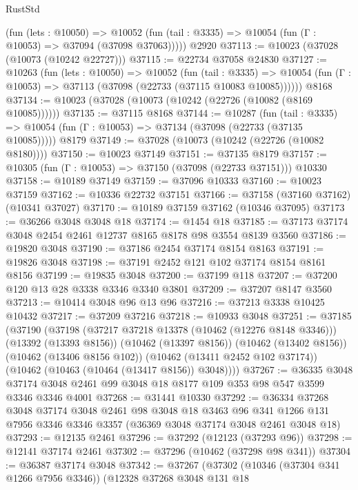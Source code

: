 \begin{lexlean}{RustStd}
\begin{coremodule}
      (fun (lets : @10050) =>
      @10052 (fun (tail : @3335) => @10054 (fun (Γ : @10053) => @37094 (@37098 @37063)))))
    @2920
@37113 := @10023 (@37028 (@10073 (@10242 @22727)))
@37115 := @22734 @37058 @24830
@37127 := @10263
    (fun (lets : @10050) =>
    @10052
      (fun (tail : @3335) =>
      @10054 (fun (Γ : @10053) => @37113 (@37098 (@22733 (@37115 @10083 @10085))))))
    @8168
@37134 := @10023 (@37028 (@10073 (@10242 (@22726 (@10082 (@8169 @10085))))))
@37135 := @37115 @8168
@37144 := @10287
    (fun (tail : @3335) => @10054 (fun (Γ : @10053) => @37134 (@37098 (@22733 (@37135 @10085)))))
    @8179
@37149 := @37028 (@10073 (@10242 (@22726 (@10082 @8180))))
@37150 := @10023 @37149
@37151 := @37135 @8179
@37157 := @10305 (fun (Γ : @10053) => @37150 (@37098 (@22733 @37151))) @10330
@37158 := @10189 @37149
@37159 := @37096 @10333
@37160 := @10023 @37159
@37162 := @10336 @22732 @37151
@37166 := @37158 (@37160 @37162) (@10341 @37027)
@37170 := @10189 @37159 @37162 (@10346 @37095)
@37173 := @36266 @3048 @3048 @18
@37174 := @1454 @18
@37185 := @37173 @37174 @3048 @2454 @2461 @12737 @8165 @8178 @98 @3554 @8139 @3560
@37186 := @19820 @3048
@37190 := @37186 @2454 @37174 @8154 @8163
@37191 := @19826 @3048
@37198 := @37191 @2452 @121 @102 @37174 @8154 @8161 @8156
@37199 := @19835 @3048
@37200 := @37199 @118
@37207 := @37200 @120 @13 @28 @3338 @3346 @3340 @3801
@37209 := @37207 @8147 @3560
@37213 := @10414 @3048 @96 @13 @96
@37216 := @37213 @3338 @10425 @10432
@37217 := @37209 @37216
@37218 := @10933 @3048
@37251 := @37185
    (@37190
      (@37198
        (@37217 @37218 @13378 (@10462 (@12276 @8148 @3346)))
        (@13392 (@13393 @8156))
        (@10462 (@13397 @8156))
        (@10462 (@13402 @8156))
        (@10462 (@13406 @8156 @102))
        (@10462 (@13411 @2452 @102 @37174))
        (@10462 (@10463 (@10464 (@13417 @8156)) @3048))))
@37267 := @36335
    @3048
    @37174
    @3048
    @2461
    @99
    @3048
    @18
    @8177
    @109
    @353
    @98
    @547
    @3599
    @3346
    @3346
    @4001
@37268 := @31441 @10330
@37292 := @36334
    @37268
    @3048
    @37174
    @3048
    @2461
    @98
    @3048
    @18
    @3463
    @96
    @341
    @1266
    @131
    @7956
    @3346
    @3346
    @3357
    (@36369 @3048 @37174 @3048 @2461 @3048 @18)
@37293 := @12135 @2461
@37296 := @37292 (@12123 (@37293 @96))
@37298 := @12141 @37174 @2461
@37302 := @37296 (@10462 (@37298 @98 @341))
@37304 := @36387 @37174 @3048
@37342 := @37267
    (@37302
      (@10346 (@37304 @341 @1266 @7956 @3346))
      (@12328
        @37268
        @3048
        @131
        @18

\end{coremodule}
\end{lexlean}
